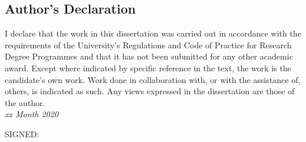 \documentclass[../main]{subfiles}
\begin{document}
\newpage
\thispagestyle{fancy}
\setlength{\parindent}{10pt}

\begin{onehalfspacing}

  \vspace*{75pt}

  \section*{\huge Author's Declaration}

  I declare that the work in this dissertation was carried out in accordance with the requirements of the University's Regulations and Code of Practice for Research Degree Programmes and that it has not been submitted for any other academic award. Except where indicated by specific reference in the text, the work is the candidate's own work. Work done in collaboration with, or with the assistance of, others, is indicated as such. Any views expressed in the dissertation are those of the author.\\[-6pt]

  \textit{xx Month 2020}

  \begin{flushright}
    SIGNED: \underline{\hspace{6cm}}
  \end{flushright}

\end{onehalfspacing}
\end{document}
